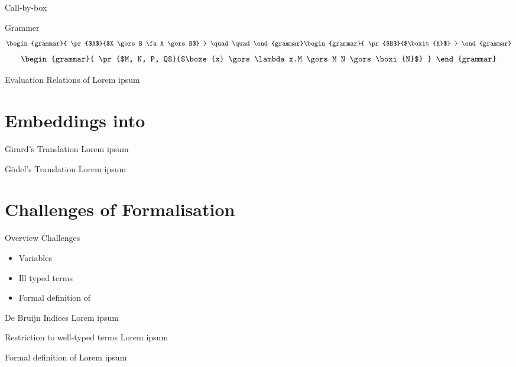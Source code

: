 \documentclass{beamer}
\theoremstyle{definition}
\begin{document}
  \begin{frame}{Call-by-box \lc}
    \begin{block}{Grammer}
      \begin{align*}
        \begin{grammar}{
          \pr{$A$}{$X \gors B \fa A \gors B$}
        } \quad \quad
        \end{grammar}
        \begin{grammar}{
          \pr{$B$}{$\boxit{A}$}
        }
        \end{grammar}
      \end{align*}
      \begin{align*}    
        \begin{grammar}{
          \pr{$M, N, P, Q$}{$\boxe{x} \gors \lambda x.M \gors M N \gors \boxi{N}$}
        }
        \end{grammar}
      \end{align*}
    \end{block}
  \end{frame}
  \begin{frame}{Evaluation Relations of \lab}
    Lorem ipsum
  \end{frame}

  \section{\texorpdfstring{Embeddings into \lab}{Embeddings into the boxed lambda calculus}}
  \begin{frame}{Girard's Translation}
    Lorem ipsum
  \end{frame}
  \begin{frame}{Gödel's Translation}
    Lorem ipsum
  \end{frame}

  \section{Challenges of Formalisation}
  \begin{frame}{Overview Challenges}
    \begin{itemize}
      \item[\textbullet] Variables
      \item[\textbullet] Ill typed terms
      \item[\textbullet] Formal definition of \raiseembn
    \end{itemize}
  \end{frame}
  \begin{frame}{De Bruijn Indices}
    Lorem ipsum
  \end{frame}
  \begin{frame}{Restriction to well-typed terms}
    Lorem ipsum
  \end{frame}
  \begin{frame}{Formal definition of \raiseembn}
    Lorem ipsum
  \end{frame}
\end{document}
